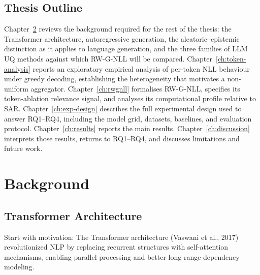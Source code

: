 \documentclass[a4paper,oneside,10pt,ngerman,english]{scrbook}
\begin{document}
\section{Thesis Outline}
\label{sec:outline}
Chapter~\ref{ch:background} reviews the background required for the rest of
the thesis: the Transformer architecture, autoregressive generation, the
aleatoric--epistemic distinction as it applies to language generation, and the
three families of LLM UQ methods against which RW-G-NLL will be compared.
Chapter~\ref{ch:token-analysis} reports an exploratory empirical analysis of
per-token NLL behaviour under greedy decoding, establishing the heterogeneity
that motivates a non-uniform aggregator. Chapter~\ref{ch:rwgnll} formalises
RW-G-NLL, specifies its token-ablation relevance signal, and analyses its
computational profile relative to SAR. Chapter~\ref{ch:exp-design} describes
the full experimental design used to answer RQ1--RQ4, including the model
grid, datasets, baselines, and evaluation protocol.
Chapter~\ref{ch:results} reports the main results. Chapter~\ref{ch:discussion}
interprets those results, returns to RQ1--RQ4, and discusses limitations and
future work.

\chapter{Background}
\label{ch:background}
%
\section{Transformer Architecture}
Start with motivation:
The Transformer architecture (Vaswani et al., 2017) revolutionized NLP by replacing recurrent structures with self-attention mechanisms, enabling parallel processing and better long-range dependency modeling.
\end{document}
